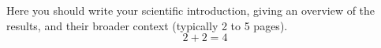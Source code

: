 \documentclass[thesis.tex]{subfiles}
\begin{document}
Here you should write your scientific introduction, giving an overview of the results, and their broader context (typically 2 to 5 pages).
\begin{equation}
  \label{eq:bla}
  2+2=4
\end{equation}
\end{document}
